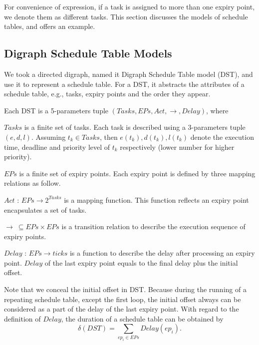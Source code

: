 \documentclass[10pt,conference]{IEEEtran}
\begin{document}
For convenience of expression, if a task is assigned to more than one expiry point, we denote them as different tasks. 
This section discusses the models of schedule tables, and offers an example.

\subsection{Digraph Schedule Table Models}
We took a directed digraph, named it Digraph Schedule Table model (DST), and use it to represent a schedule table. For a DST, it abstracts the attributes of a schedule table, e.g., tasks, expiry points and the order they appear.

Each DST is a 5-parameters tuple $(Tasks,EPs,Act,\rightarrow,Delay)$, where
\begin{compactitem}
  \item $Tasks$ is a finite set of tasks. Each task is described using a 3-parameters tuple $(e,d,l)$. Assuming $t_k\in Tasks$, then $e(t_k),d(t_k),l(t_k)$ denote the execution time, deadline and priority level of $t_k$ respectively (lower number for higher priority).%
  \item $EPs$ is a finite set of expiry points. Each expiry point is defined by three mapping relations as follow.
  \item $Act$ : $EPs \rightarrow 2^{Tasks}$ is a mapping function. This function reflects an expiry point encapsulates a set of tasks. 
  \item $\rightarrow\ \subseteq EPs\times EPs$ is a transition relation to describe the execution sequence of expiry points. 
  \item $Delay$ : $EPs \rightarrow ticks$ is a function to describe the delay after processing an expiry point. $Delay$ of the last expiry point equals to the final delay plus the initial offset.
\end{compactitem}

Note that we conceal the initial offset in DST. Because during the running of a repeating schedule table, except the first loop, the initial offset always can be considered as a part of the delay of the last expiry point. With regard to the definition of $Delay$, the duration of a schedule table can be obtained by 
\[\delta(DST)=\sum\limits_{ep_i\in EPs}Delay(ep_i).\]
\end{document}
